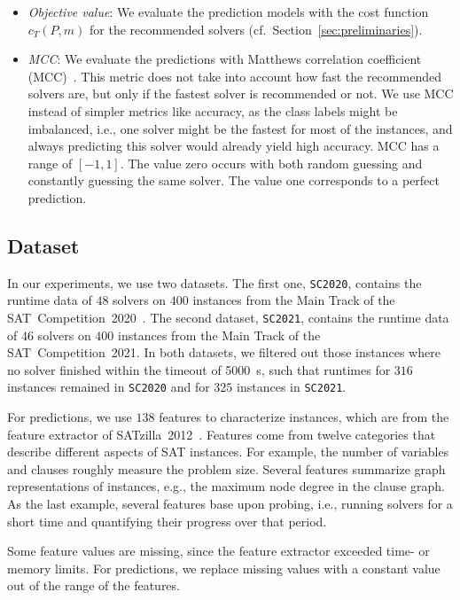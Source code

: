 \documentclass[a4paper,USenglish,pdfa]{lipics-v2021} %
\begin{document}
\begin{itemize}
	\item \emph{Objective value}:
	We evaluate the prediction models with the cost function $c_{T}(P,m)$ for the recommended solvers (cf.~Section~\ref{sec:preliminaries}). 
	\item \emph{MCC}:
	We evaluate the predictions with Matthews correlation coefficient (MCC)~\cite{matthews1975comparison,gorodkin2004comparing}.
	This metric does not take into account how fast the recommended solvers are, but only if the fastest solver is recommended or not.
	We use MCC instead of simpler metrics like accuracy, as the class labels might be imbalanced, i.e., one solver might be the fastest for most of the instances, and always predicting this solver would already yield high accuracy.
	MCC has a range of $[-1,1]$. 
	The value zero occurs with both random guessing and constantly guessing the same solver.
	The value one corresponds to a perfect prediction.
\end{itemize}

\subsection{Dataset}

In our experiments, we use two datasets. 
The first one, \texttt{SC2020}, contains the runtime data of $48$ solvers on $400$ instances from the Main Track of the SAT~Competition~2020~\cite{balyo2020proceedings,SC2020:AIJ}.
The second dataset, \texttt{SC2021}, contains the runtime data of $46$ solvers on $400$ instances from the Main Track of the SAT~Competition~2021. 
In both datasets, we filtered out those instances where no solver finished within the timeout of 5000~s, such that runtimes for $316$ instances remained in \texttt{SC2020} and for $325$ instances in \texttt{SC2021}.

For predictions, we use $138$ features to characterize instances, which are from the feature extractor of SATzilla~2012~\cite{xu2012features}. 
Features come from twelve categories that describe different aspects of SAT instances.
For example, the number of variables and clauses roughly measure the problem size.
Several features summarize graph representations of instances, e.g., the maximum node degree in the clause graph.
As the last example, several features base upon probing, i.e., running solvers for a short time and quantifying their progress over that period.

Some feature values are missing, since the feature extractor exceeded time- or memory limits.
For predictions, we replace missing values with a constant value out of the range of the features.
\end{document}
